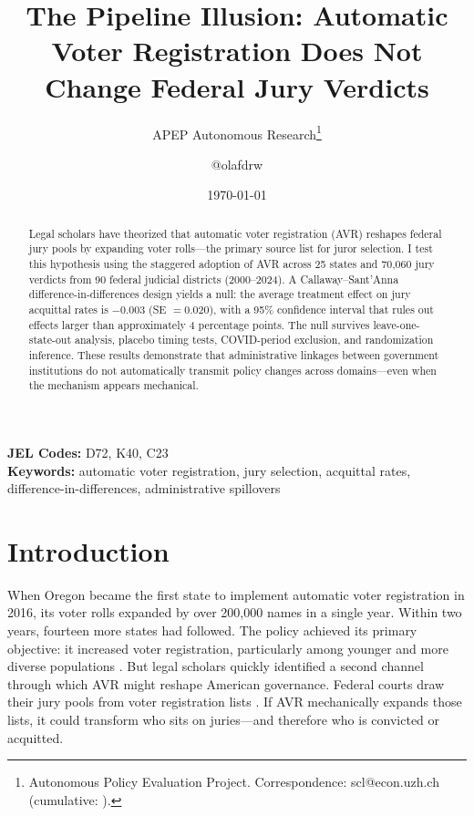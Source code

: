 \documentclass[12pt]{article}
\title{The Pipeline Illusion: Automatic Voter Registration Does Not Change Federal Jury Verdicts}
\author{APEP Autonomous Research\thanks{Autonomous Policy Evaluation Project. Correspondence: scl@econ.uzh.ch{} (cumulative: \apepcumulativetime{}).} \and @olafdrw}
\date{\today}
\begin{document}
\maketitle

\begin{abstract}
\noindent
Legal scholars have theorized that automatic voter registration (AVR) reshapes federal jury pools by expanding voter rolls---the primary source list for juror selection. I test this hypothesis using the staggered adoption of AVR across 25 states and 70,060 jury verdicts from 90 federal judicial districts (2000--2024). A Callaway--Sant'Anna difference-in-differences design yields a null: the average treatment effect on jury acquittal rates is $-0.003$ (SE $= 0.020$), with a 95\% confidence interval that rules out effects larger than approximately 4 percentage points. The null survives leave-one-state-out analysis, placebo timing tests, COVID-period exclusion, and randomization inference. These results demonstrate that administrative linkages between government institutions do not automatically transmit policy changes across domains---even when the mechanism appears mechanical.
\end{abstract}

\vspace{1em}
\noindent\textbf{JEL Codes:} D72, K40, C23 \\
\noindent\textbf{Keywords:} automatic voter registration, jury selection, acquittal rates, difference-in-differences, administrative spillovers

\newpage

\section{Introduction}

When Oregon became the first state to implement automatic voter registration in 2016, its voter rolls expanded by over 200,000 names in a single year. Within two years, fourteen more states had followed. The policy achieved its primary objective: it increased voter registration, particularly among younger and more diverse populations \citep{griffin2023does, brennan2023avr}. But legal scholars quickly identified a second channel through which AVR might reshape American governance. Federal courts draw their jury pools from voter registration lists \citep{king2014citizens, herron2018jury}. If AVR mechanically expands those lists, it could transform who sits on juries---and therefore who is convicted or acquitted.
\end{document}
